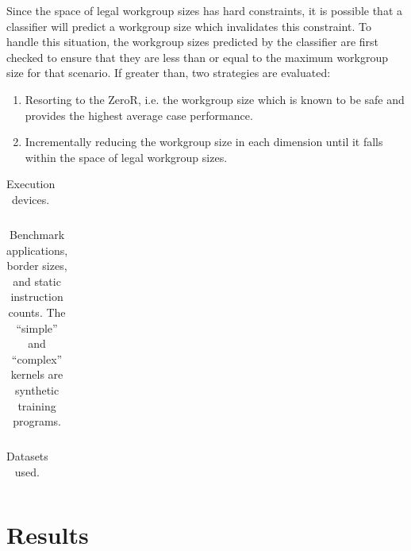 Since the space of legal workgroup sizes has hard constraints, it is
possible that a classifier will predict a workgroup size which
invalidates this constraint. To handle this situation, the workgroup
sizes predicted by the classifier are first checked to ensure that
they are less than or equal to the maximum workgroup size for that
scenario. If greater than, two strategies are evaluated:

\begin{enumerate}
\item Resorting to the ZeroR, i.e. the workgroup size which is known
  to be safe and provides the highest average case performance.
\item Incrementally reducing the workgroup size in each dimension
  until it falls within the space of legal workgroup sizes.
\end{enumerate}

\begin{table}
\footnotesize
\centering
\begin{tabular}{| L{1.2cm} | L{6.2cm} | L{1.5cm} | L{1.5cm} | L{1.5cm} | L{1.5cm} | L{1.5cm} |}
\hline

\hline
\end{tabular}
\caption{%
  Execution devices. %
}
\label{tab:hw}
\end{table}

\begin{table}
\footnotesize
\centering
\begin{tabular}{| l | l | l | l | l | l |}
\hline

\hline
\end{tabular}
\caption{%
  Benchmark applications, border sizes, and static instruction counts.
  The ``simple'' and ``complex'' kernels are synthetic training
  programs. %
}
\label{tab:kernels}
\end{table}

\begin{table}
\footnotesize
\centering
\begin{tabular}{| l | l | l | l |}
\hline

\hline
\end{tabular}
\caption{%
  Datasets used.%
}
\label{tab:datasets}
\end{table}

\section{Results}


